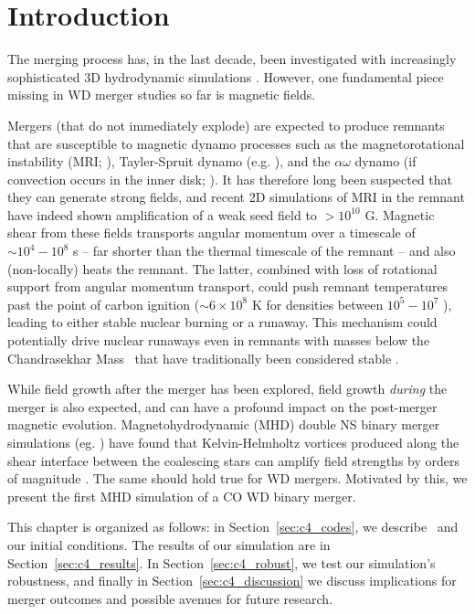 \section{Introduction}
\label{sec:c4_intro}

The merging process has, in the last decade, been investigated with increasingly sophisticated 3D hydrodynamic simulations \citep{loreig09, pakm+10, dan+12, dan+14, rask+12, zhu+13, moll+14}.  However, one fundamental piece missing in WD merger studies so far is magnetic fields.

Mergers (that do not immediately explode) are expected to produce remnants that are susceptible to magnetic dynamo processes such as the magnetorotational instability (MRI; \citealt{balbh91}), Tayler-Spruit dynamo (e.g. \citealt{spru02}), and the $\alpha\omega$ dynamo (if convection occurs in the inner disk; \citealt{garc+12}).  It has therefore long been suspected that they can generate strong fields, and recent 2D simulations of MRI in the remnant \citep{ji+13} have indeed shown amplification of a weak seed field to $>10^{10}$ G.  Magnetic shear from these fields transports angular momentum over a timescale of $\sim10^4 - 10^8$ s \citep{vkercj10, shen+12} -- far shorter than the thermal timescale of the remnant -- and also (non-locally) heats the remnant.  The latter, combined with loss of rotational support from angular momentum transport, could push remnant temperatures past the point of carbon ignition ($\sim6\times10^8$ K for densities between $10^5 - 10^7$ \gcc), leading to either stable nuclear burning or a runaway.  This mechanism could potentially drive nuclear runaways even in remnants with masses below the Chandrasekhar Mass \Mch\ that have traditionally been considered stable \citep{vkercj10}.

While field growth after the merger has been explored, field growth \textit{during} the merger is also expected, and can have a profound impact on the post-merger magnetic evolution.  Magnetohydrodynamic (MHD) double NS binary merger simulations (eg. \citealt{pricr06, kiuc+14, giac+15}) have found that Kelvin-Helmholtz vortices produced along the shear interface between the coalescing stars can amplify field strengths by orders of magnitude \citep{oberam10, zrakm13}.  The same should hold true for WD mergers.  Motivated by this, we present the first MHD simulation of a CO WD binary merger.


This chapter is organized as follows: in Section~\ref{sec:c4_codes}, we describe \arepo\ and our initial conditions.  The results of our simulation are in Section~\ref{sec:c4_results}.  In Section~\ref{sec:c4_robust}, we test our simulation's robustness, and finally in Section~\ref{sec:c4_discussion} we discuss implications for merger outcomes and possible avenues for future research.
